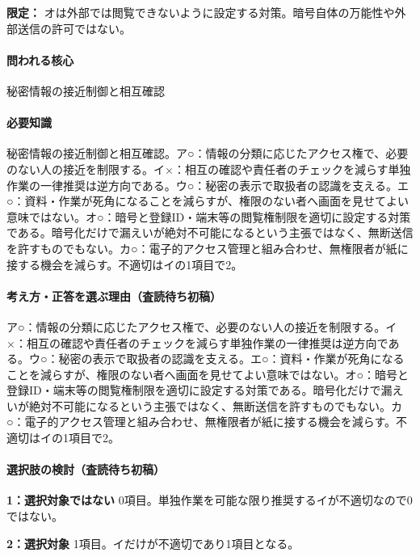 \noindent\textbf{限定：} オは外部では閲覧できないように設定する対策。暗号自体の万能性や外部送信の許可ではない。\par

\paragraph{問われる核心} 秘密情報の接近制御と相互確認

\paragraph{必要知識} 秘密情報の接近制御と相互確認。ア○：情報の分類に応じたアクセス権で、必要のない人の接近を制限する。イ×：相互の確認や責任者のチェックを減らす単独作業の一律推奨は逆方向である。ウ○：秘密の表示で取扱者の認識を支える。エ○：資料・作業が死角になることを減らすが、権限のない者へ画面を見せてよい意味ではない。オ○：暗号と登録ID・端末等の閲覧権制限を適切に設定する対策である。暗号化だけで漏えいが絶対不可能になるという主張ではなく、無断送信を許すものでもない。カ○：電子的アクセス管理と組み合わせ、無権限者が紙に接する機会を減らす。不適切はイの1項目で2。

\paragraph{考え方・正答を選ぶ理由（査読待ち初稿）} ア○：情報の分類に応じたアクセス権で、必要のない人の接近を制限する。イ×：相互の確認や責任者のチェックを減らす単独作業の一律推奨は逆方向である。ウ○：秘密の表示で取扱者の認識を支える。エ○：資料・作業が死角になることを減らすが、権限のない者へ画面を見せてよい意味ではない。オ○：暗号と登録ID・端末等の閲覧権制限を適切に設定する対策である。暗号化だけで漏えいが絶対不可能になるという主張ではなく、無断送信を許すものでもない。カ○：電子的アクセス管理と組み合わせ、無権限者が紙に接する機会を減らす。不適切はイの1項目で2。

\paragraph{選択肢の検討（査読待ち初稿）}\mbox{}\par

\noindent\textbf{1：選択対象ではない} 0項目。単独作業を可能な限り推奨するイが不適切なので0ではない。\par

\noindent\textbf{2：選択対象} 1項目。イだけが不適切であり1項目となる。\par

